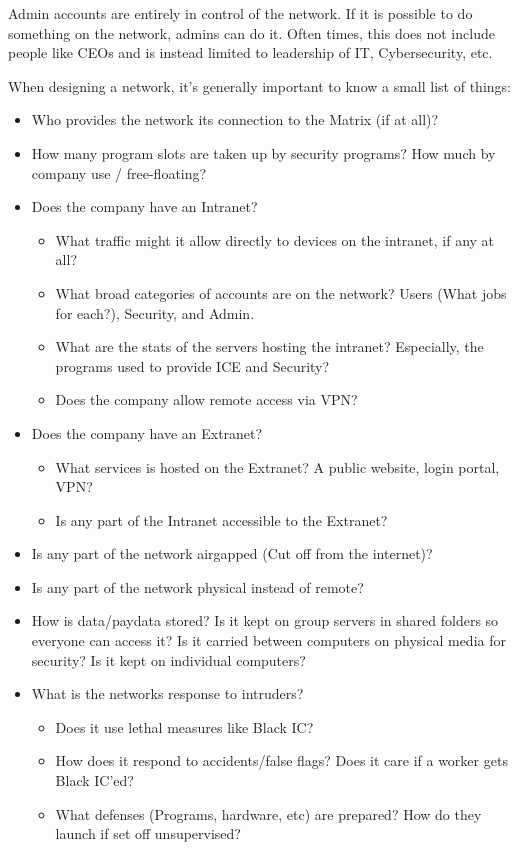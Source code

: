 \begin{multicols*}{3}
	Admin accounts are entirely in control of the network. If it is possible to do something on the network, admins can do it. Often times, this does not include people like CEOs and is instead limited to leadership of IT, Cybersecurity, etc.
	
	When designing a network, it's generally important to know a small list of things: 
	
	\begin{itemize}
		\itemsep 0pt
		\item Who provides the network its connection to the Matrix (if at all)? 
		\item How many program slots are taken up by security programs? How much by company use / free-floating?
		\item Does the company have an Intranet?
		\begin{itemize}
			\itemsep 0pt
			\item What traffic might it allow directly to devices on the intranet, if any at all?
			\item What broad categories of accounts are on the network? Users (What jobs for each?), Security, and Admin.
			\item What are the stats of the servers hosting the intranet? Especially, the programs used to provide ICE and Security?
			\item Does the company allow remote access via VPN?
		\end{itemize}
		\item Does the company have an Extranet?
		\begin{itemize}
			\itemsep 0pt
			\item What services is hosted on the Extranet? A public website, login portal, VPN?
			\item Is any part of the Intranet accessible to the Extranet?
		\end{itemize}
		\item Is any part of the network airgapped (Cut off from the internet)?
		\item Is any part of the network physical instead of remote?
		\item How is data/paydata stored? Is it kept on group servers in shared folders so everyone can access it? Is it carried between computers on physical media for security? Is it kept on individual computers?
		\item What is the networks response to intruders?
		\begin{itemize}
			\itemsep 0pt
			\item Does it use lethal measures like Black IC?
			\item How does it respond to accidents/false flags? Does it care if a worker gets Black IC'ed?
			\item What defenses (Programs, hardware, etc) are prepared? How do they launch if set off unsupervised?
		\end{itemize}
	\end{itemize} 
	

\end{multicols*}
